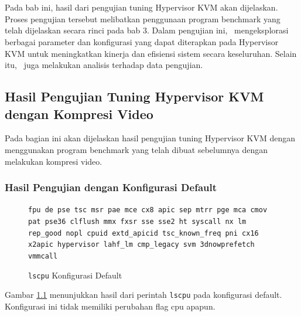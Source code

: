 \chapter{\babEmpat}
Pada bab ini, hasil dari pengujian tuning Hypervisor KVM akan dijelaskan. Proses pengujian tersebut melibatkan penggunaan program benchmark yang telah dijelaskan secara rinci pada bab 3. Dalam pengujian ini, \saya\ mengeksplorasi berbagai parameter dan konfigurasi yang dapat diterapkan pada Hypervisor KVM untuk meningkatkan kinerja dan efisiensi sistem secara keseluruhan. Selain itu, \saya\ juga melakukan analisis terhadap data pengujian.

\section{Hasil Pengujian Tuning Hypervisor KVM dengan Kompresi Video}
Pada bagian ini akan dijelaskan hasil pengujian tuning Hypervisor KVM dengan menggunakan program benchmark yang telah dibuat sebelumnya dengan melakukan kompresi video.

\subsection{Hasil Pengujian dengan Konfigurasi Default}
\begin{figure}
    \texttt{fpu de pse tsc msr pae mce cx8 apic sep mtrr pge mca cmov pat pse36 clflush mmx fxsr sse sse2 ht syscall nx lm rep\_good nopl cpuid extd\_apicid tsc\_known\_freq pni cx16 x2apic hypervisor lahf\_lm cmp\_legacy svm 3dnowprefetch vmmcall}
    \caption{\texttt{lscpu} Konfigurasi Default}
    \label{fig:lscpu_video_compression_test_original}
\end{figure}

Gambar \ref{fig:lscpu_video_compression_test_original} menunjukkan hasil dari perintah \texttt{lscpu} pada konfigurasi default. Konfigurasi ini tidak memiliki perubahan flag cpu apapun.

